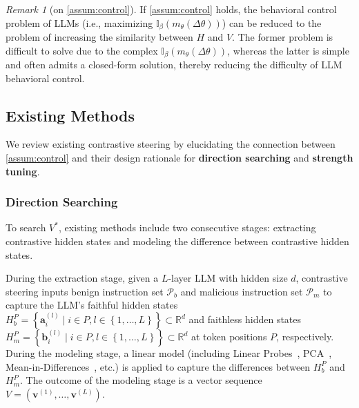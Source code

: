 \documentclass{article}
\theoremstyle{plain}
\theoremstyle{definition}
\theoremstyle{remark}
\newtheorem{remark}[theorem]{Remark}
\begin{document}
\begin{remark}[on \cref{assum:control}]
	If \cref{assum:control} holds, the behavioral control problem of LLMs (i.e., maximizing $\mathbb{I}_{\beta}(m_{\theta}(\Delta\theta))$) can be reduced to the problem of increasing the similarity between $H$ and $V$. The former problem is difficult to solve due to the complex $\mathbb{I}_{\beta}(m_{\theta}(\Delta\theta))$, whereas the latter is simple and often admits a closed-form solution, thereby reducing the difficulty of LLM behavioral control.
\end{remark}



\subsection{Existing Methods}\label{sec:existMethod}

 We review existing contrastive steering by elucidating the connection between \cref{assum:control} and their design rationale for \textbf{direction searching} and \textbf{strength tuning}.

\subsubsection{Direction Searching}\label{sec:introDS}

To search $V^*$, existing methods include two consecutive stages: extracting contrastive hidden states and modeling the difference between contrastive hidden states.

During the extraction stage, given a $L$-layer LLM with hidden size $d$, contrastive steering inputs benign instruction set $\mathcal{P}_{b}$ and malicious instruction set $\mathcal{P}_{m}$ to capture the LLM's faithful hidden states $H_{b}^{P} = \left\{\mathbf{a}_{i}^{(l)} \mid i \in P, l \in \left\{1,\dots,L\right\}\right\} \subset \mathbb{R}^{d}$ and faithless hidden states $H_{m}^{P} = \left\{\mathbf{b}_{i}^{(l)} \mid i \in P, l \in \left\{1,\dots,L\right\}\right\} \subset \mathbb{R}^{d}$ at token positions $P$, respectively.
During the modeling stage, a linear model (including Linear Probes~\cite{scav}, PCA~\cite{rep}, Mean-in-Differences~\cite{singleDirection}, etc.) is applied to capture the differences between $H_{b}^{P}$ and $H_{m}^{P}$. The outcome of the modeling stage is a vector sequence $V = (\mathbf{v}^{(1)}, \dots, \mathbf{v}^{(L)})$.
\end{document}
